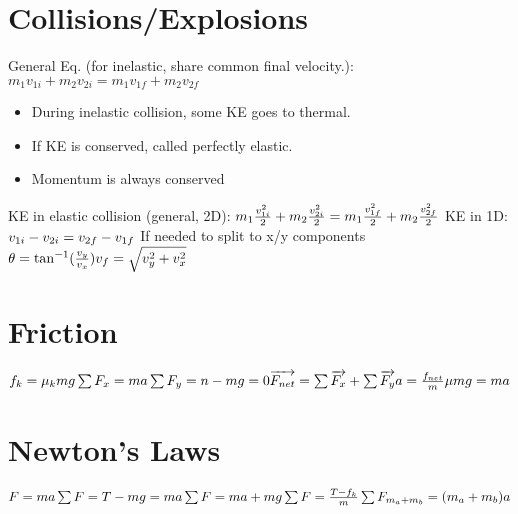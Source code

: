 \documentclass[11pt]{article}
\begin{document}
\begin{paracol}{3}
        \section*{Collisions/Explosions}
        \begin{fleqn}
            General Eq. (for inelastic, share common final velocity.): \newline
            $
            m_1 v_{1i} + m_2 v_{2i} = m_1 v_{1f} + m_2 v_{2f}
            $
            \begin{itemize}
                \item During inelastic collision, some KE goes to thermal.
                \item If KE is conserved, called perfectly elastic.
                \item Momentum is always conserved
            \end{itemize}
            KE in elastic collision (general, 2D): \newline
            $
            m_1 \frac{v_{1i}^2}{2} + m_2 \frac{v_{2i}^2}{2} = m_1 \frac{v_{1f}^2}{2} + m_2 \frac{v_{2f}^2}{2} \newline
            $
            KE in 1D:
            $
            v_{1i} - v_{2i} = v_{2f} - v_{1f} \newline
            $
            If needed to split to x/y components
            $
            \theta = \tan^{-1}(\frac{v_y}{v_x}) \newline
            v_f = \sqrt{v_y^2 + v_x^2} \newline
            $
        \end{fleqn}
        \section*{Friction}
        \begin{fleqn}
            $
            f_k = \mu_{k}mg \newline
            \sum F_x = ma \newline
            \sum F_y = n-mg = 0 \newline
            \overrightarrow{F_{net}} = \sum \overrightarrow{F_x}+\sum \overrightarrow{F_y} \newline
            a=\frac{f_{net}}{m} \newline
            \mu mg = ma \newline
                        $
        \end{fleqn}
        \switchcolumn
        \section*{Newton's Laws}
        \begin{fleqn}
            $
            F=ma \newline
            \sum F = T - mg = ma \newline
            \sum F = ma + mg \newline
            \sum F = \frac{T-f_k}{m} \newline
            \sum F_{m_a+m_b} = (m_a+m_b)a \newline
            $
        \end{fleqn}

\end{paracol}
\end{document}
